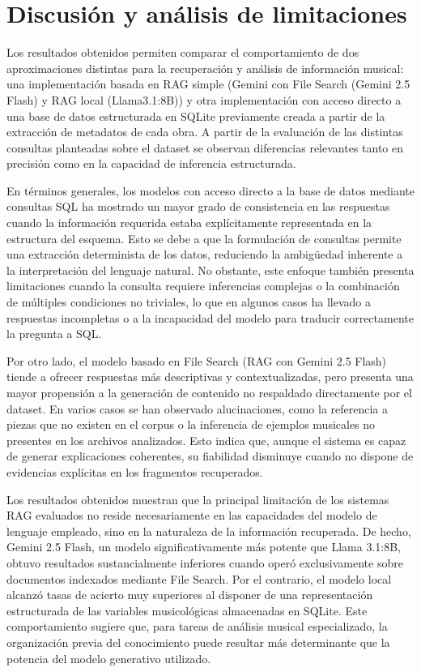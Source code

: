 \chapter{Discusión y análisis de limitaciones}
\label{cap:discusion}

Los resultados obtenidos permiten comparar el comportamiento de dos aproximaciones distintas para la recuperación y análisis de información musical: una implementación basada en RAG simple (Gemini con File Search (Gemini 2.5 Flash) y RAG local (Llama3.1:8B)) y otra implementación con acceso directo a una base de datos estructurada en SQLite previamente creada a partir de la extracción de metadatos de cada obra. A partir de la evaluación de las distintas consultas planteadas sobre el dataset se observan diferencias relevantes tanto en precisión como en la capacidad de inferencia estructurada.

En términos generales, los modelos con acceso directo a la base de datos mediante consultas SQL ha mostrado un mayor grado de consistencia en las respuestas cuando la información requerida estaba explícitamente representada en la estructura del esquema. Esto se debe a que la formulación de consultas permite una extracción determinista de los datos, reduciendo la ambigüedad inherente a la interpretación del lenguaje natural. No obstante, este enfoque también presenta limitaciones cuando la consulta requiere inferencias complejas o la combinación de múltiples condiciones no triviales, lo que en algunos casos ha llevado a respuestas incompletas o a la incapacidad del modelo para traducir correctamente la pregunta a SQL.

Por otro lado, el modelo basado en File Search (RAG con Gemini 2.5 Flash) tiende a ofrecer respuestas más descriptivas y contextualizadas, pero presenta una mayor propensión a la generación de contenido no respaldado directamente por el dataset. En varios casos se han observado alucinaciones, como la referencia a piezas que no existen en el corpus o la inferencia de ejemplos musicales no presentes en los archivos analizados. Esto indica que, aunque el sistema es capaz de generar explicaciones coherentes, su fiabilidad disminuye cuando no dispone de evidencias explícitas en los fragmentos recuperados.

Los resultados obtenidos muestran que la principal limitación de los sistemas RAG evaluados no reside necesariamente en las capacidades del modelo de lenguaje empleado, sino en la naturaleza de la información recuperada. De hecho, Gemini 2.5 Flash, un modelo significativamente más potente que Llama 3.1:8B, obtuvo resultados sustancialmente inferiores cuando operó exclusivamente sobre documentos indexados mediante File Search. Por el contrario, el modelo local alcanzó tasas de acierto muy superiores al disponer de una representación estructurada de las variables musicológicas almacenadas en SQLite. Este comportamiento sugiere que, para tareas de análisis musical especializado, la organización previa del conocimiento puede resultar más determinante que la potencia del modelo generativo utilizado.

